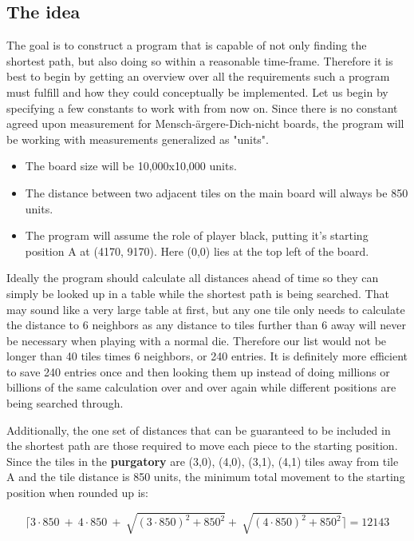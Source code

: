 \documentclass[12pt]{article}
\begin{document}
\subsection{The idea}
The goal is to construct a program that is capable of not only finding the shortest path, but also doing so within a reasonable time-frame. Therefore it is best to begin by getting an overview over all the requirements such a program must fulfill and how they could conceptually be implemented. Let us begin by specifying a few constants to work with from now on. Since there is no constant agreed upon measurement for Mensch-ärgere-Dich-nicht boards, the program will be working with measurements generalized as "units".
\begin{itemize}
    \item The board size will be 10,000x10,000 units.
    \item The distance between two adjacent tiles on the main board will always be 850 units.
    \item The program will assume the role of player black, putting it's starting position A at (4170, 9170). Here (0,0) lies at the top left of the board.
\end{itemize}

Ideally the program should calculate all distances ahead of time so they can simply be looked up in a table while the shortest path is being searched. That may sound like a very large table at first, but any one tile only needs to calculate the distance to 6 neighbors as any distance to tiles further than 6 away will never be necessary when playing with a normal die. Therefore our list would not be longer than 40 tiles times 6 neighbors, or 240 entries. It is definitely more efficient to save 240 entries once and then looking them up instead of doing millions or billions of the same calculation over and over again while different positions are being searched through.

Additionally, the one set of distances that can be guaranteed to be included in the shortest path are those required to move each piece to the starting position. Since the tiles in the \textbf{purgatory} are (3,0), (4,0), (3,1), (4,1) tiles away from tile A and the tile distance is 850 units, the minimum total movement to the starting position when rounded up is:

\[
	\lceil 3\cdot850\ +\ 4\cdot850\ +\ \sqrt{\left(3\cdot850\right)^{2}+850^{2}}+\ \sqrt{\left(4\cdot850\right)^{2}+850^{2}}\rceil = 12143
\]

\newpage
\end{document}
